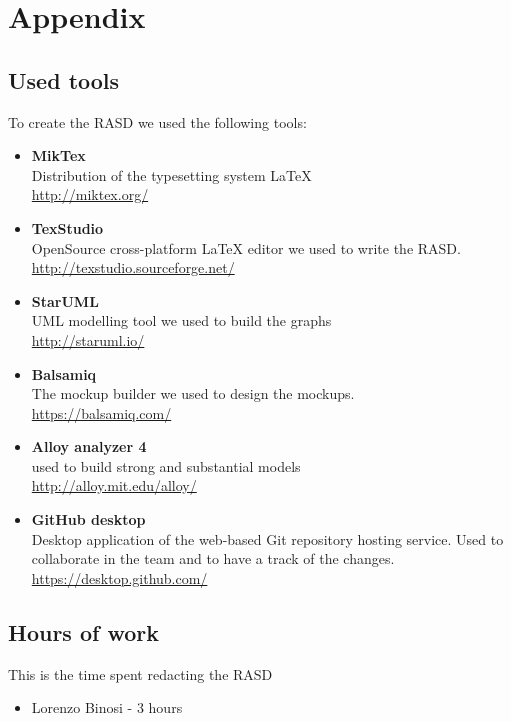 \section{Appendix}
\subsection{Used tools}
To create the RASD we used the following tools:
\begin{itemize}
	\item \textbf{MikTex} \\ Distribution of the typesetting system LaTeX \\ \url{http://miktex.org/} 
	\item \textbf{TexStudio}\\ OpenSource cross-platform LaTeX editor we used to write the RASD. \\ \url{http://texstudio.sourceforge.net/} 
	\item \textbf{StarUML}\\ UML modelling tool we used to build the graphs\\ \url{http://staruml.io/} 
	\item \textbf{Balsamiq}\\ The mockup builder we used to design the mockups. \\ \url{https://balsamiq.com/} 
	\item \textbf{Alloy analyzer 4}\\ used to build  strong and substantial models \\ \url{ http://alloy.mit.edu/alloy/}
	\item \textbf{GitHub desktop}\\ Desktop application of the web-based Git repository hosting service. Used to collaborate in the team and to have a track of the changes.  \\ \url{https://desktop.github.com/} 
\end{itemize}


\subsection{Hours of work}
This is the time spent redacting the RASD
\begin{itemize}
	\item {Lorenzo Binosi} - 3 hours
\end{itemize}

